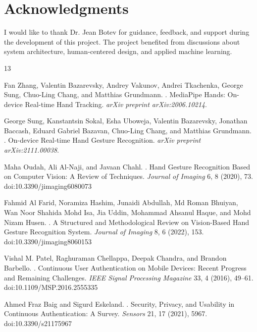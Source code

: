 \documentclass[10pt,twocolumn]{article}
\begin{document}
\section*{Acknowledgments}
I would like to thank Dr. Jean Botev for guidance, feedback, and support during the development of this project.
The project benefited from discussions about system architecture, human-centered design, and applied machine learning.

\begin{thebibliography}{13}

Fan Zhang, Valentin Bazarevsky, Andrey Vakunov, Andrei Tkachenka, George Sung, Chuo-Ling Chang, and Matthias Grundmann.
.
\newblock MediaPipe Hands: On-device Real-time Hand Tracking.
\newblock \textit{arXiv preprint arXiv:2006.10214}.

George Sung, Kanstantsin Sokal, Esha Uboweja, Valentin Bazarevsky, Jonathan Baccash, Eduard Gabriel Bazavan, Chuo-Ling Chang, and Matthias Grundmann.
.
\newblock On-device Real-time Hand Gesture Recognition.
\newblock \textit{arXiv preprint arXiv:2111.00038}.

Maha Oudah, Ali Al-Naji, and Javaan Chahl.
.
\newblock Hand Gesture Recognition Based on Computer Vision: A Review of Techniques.
\newblock \textit{Journal of Imaging} 6, 8 (2020), 73.
\newblock doi:10.3390/jimaging6080073

Fahmid Al Farid, Noramiza Hashim, Junaidi Abdullah, Md Roman Bhuiyan, Wan Noor Shahida Mohd Isa, Jia Uddin, Mohammad Ahsanul Haque, and Mohd Nizam Husen.
.
\newblock A Structured and Methodological Review on Vision-Based Hand Gesture Recognition System.
\newblock \textit{Journal of Imaging} 8, 6 (2022), 153.
\newblock doi:10.3390/jimaging8060153

Vishal M. Patel, Raghuraman Chellappa, Deepak Chandra, and Brandon Barbello.
.
\newblock Continuous User Authentication on Mobile Devices: Recent Progress and Remaining Challenges.
\newblock \textit{IEEE Signal Processing Magazine} 33, 4 (2016), 49--61.
\newblock doi:10.1109/MSP.2016.2555335

Ahmed Fraz Baig and Sigurd Eskeland.
.
\newblock Security, Privacy, and Usability in Continuous Authentication: A Survey.
\newblock \textit{Sensors} 21, 17 (2021), 5967.
\newblock doi:10.3390/s21175967


\end{thebibliography}
\end{document}
